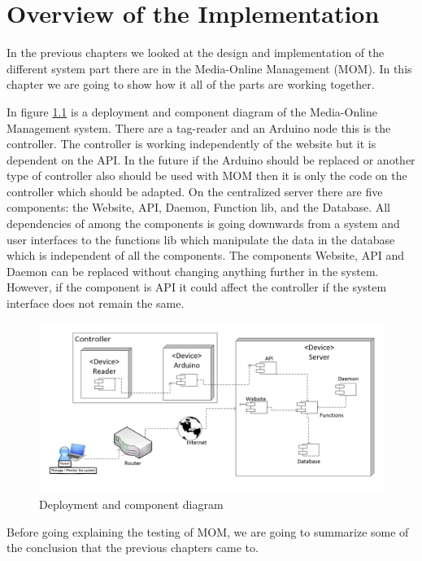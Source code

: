 \chapter{Overview of the Implementation}

In the previous chapters we looked at the design and implementation of the different system part there are in the Media-Online Management (MOM).
In this chapter we are going to show how it all of the parts are working together.

In figure \ref{fig:deployment} is a deployment and component diagram of the Media-Online Management system. There are a tag-reader and an Arduino node this is the controller. The controller is working independently of the website but it is dependent on the API. In the future if the Arduino should be replaced or another type of controller also should be used with MOM then it is only the code on the controller which should be adapted. 
On the centralized server there are five components: the Website, API, Daemon, Function lib, and the Database. All dependencies of among the components is going downwards from a system and user interfaces to the functions lib which manipulate the data in the database which is independent of all the components.
 The components Website, API and Daemon can be replaced without changing anything further in the system. However, if the component is API it could affect the controller if the system interface does not remain the same.
    
\begin{figure}
	\centering
		\includegraphics[width=1.50\textwidth, angle=90 ]{images/deployment.jpg}
	\caption{Deployment and component diagram}
	\label{fig:deployment}
\end{figure}


Before going explaining the testing of MOM, we are going to summarize some of the conclusion that the previous chapters came to.

